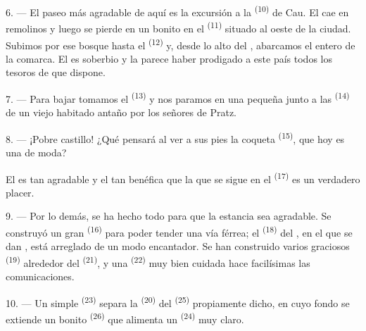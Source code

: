 \VUsaut{3.0mm}
\VUsaut{3.0mm}

6. --- El paseo más agradable de aquí es la excursión a la 
\textsuperscript{(10)} de Cau. El  cae en remolinos y luego se
pierde en un bonito  en el 
\textsuperscript{(11)} situado al oeste de la ciudad. Subimos por ese bosque hasta
el  \textsuperscript{(12)} y, desde lo alto del
, abarcamos el  entero de la comarca. El
 es soberbio y la  parece haber prodigado
a este país todos los tesoros de que dispone.

7. --- Para bajar tomamos el  \textsuperscript{(13)} y nos paramos
en una pequeña  junto a las  \textsuperscript{(14)} de
un viejo  habitado antaño por los señores de Pratz.

8. --- ¡Pobre castillo! ¿Qué pensará al ver a sus pies la coqueta
 \textsuperscript{(15)}, que hoy es una
 de moda?

El  es tan agradable y el  tan benéfica
que la  que se sigue en el  \textsuperscript{(17)} es
un verdadero placer.

\VUsaut{3.0mm}
\VUsaut{3.0mm}

9. --- Por lo demás, se ha hecho todo para que la estancia sea agradable.
Se construyó un gran  \textsuperscript{(16)} para poder tender una
vía férrea; el  \textsuperscript{(18)} del , en el
que se dan , está arreglado de un modo encantador. Se
han construido varios graciosos  \textsuperscript{(19)} alrededor del
 \textsuperscript{(21)}, y una  \textsuperscript{(22)} muy bien
cuidada hace facilísimas las comunicaciones.

10. --- Un simple  \textsuperscript{(23)} separa la 
\textsuperscript{(20)} del  \textsuperscript{(25)} propiamente dicho, en cuyo
fondo se extiende un bonito  \textsuperscript{(26)} que alimenta un
 \textsuperscript{(24)} muy claro.

